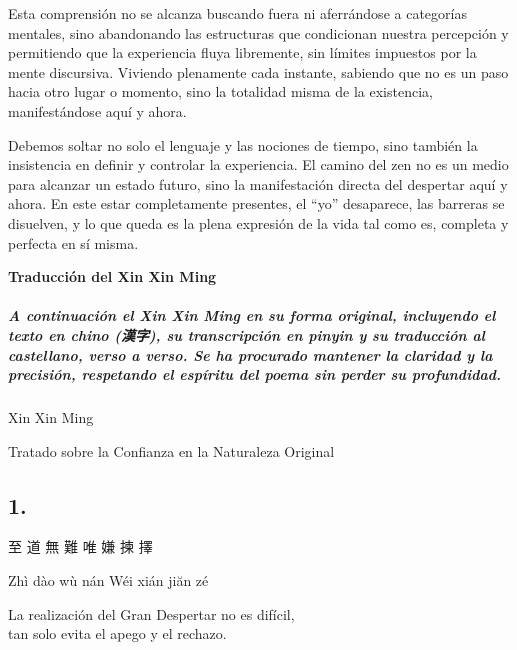 \documentclass[
  a5paperpaper,
]{article}
\begin{document}
Esta comprensión no se alcanza buscando fuera ni aferrándose a
categorías mentales, sino abandonando las estructuras que condicionan
nuestra percepción y permitiendo que la experiencia fluya libremente,
sin límites impuestos por la mente discursiva. Viviendo plenamente cada
instante, sabiendo que no es un paso hacia otro lugar o momento, sino la
totalidad misma de la existencia, manifestándose aquí y ahora.

Debemos soltar no solo el lenguaje y las nociones de tiempo, sino
también la insistencia en definir y controlar la experiencia. El camino
del zen no es un medio para alcanzar un estado futuro, sino la
manifestación directa del despertar aquí y ahora. En este estar
completamente presentes, el ``yo'' desaparece, las barreras se
disuelven, y lo que queda es la plena expresión de la vida tal como es,
completa y perfecta en sí misma.

\hfill\break

\newpage

\begin{center}\textbf{Traducción del Xin Xin Ming}\end{center}

\hypertarget{a-continuaciuxf3n-el-xin-xin-ming-en-su-forma-original-incluyendo-el-texto-en-chino-ux6f22ux5b57-su-transcripciuxf3n-en-pinyin-y-su-traducciuxf3n-al-castellano-verso-a-verso.-se-ha-procurado-mantener-la-claridad-y-la-precisiuxf3n-respetando-el-espuxedritu-del-poema-sin-perder-su-profundidad.}{%
\subparagraph{A continuación el Xin Xin Ming en su forma original,
incluyendo el texto en chino (漢字), su transcripción en pinyin y su
traducción al castellano, verso a verso. Se ha procurado mantener la
claridad y la precisión, respetando el espíritu del poema sin perder su
profundidad.}\label{a-continuaciuxf3n-el-xin-xin-ming-en-su-forma-original-incluyendo-el-texto-en-chino-ux6f22ux5b57-su-transcripciuxf3n-en-pinyin-y-su-traducciuxf3n-al-castellano-verso-a-verso.-se-ha-procurado-mantener-la-claridad-y-la-precisiuxf3n-respetando-el-espuxedritu-del-poema-sin-perder-su-profundidad.}}

Xin Xin Ming

Tratado sobre la Confianza en la Naturaleza Original

\begin{verseblock}

\hypertarget{section-75}{%
\subsection{1.}\label{section-75}}

至 道 無 難 唯 嫌 揀 擇

Zhì dào wù nán Wéi xián jiăn zé

La realización del Gran Despertar no es difícil,\\
tan solo evita el apego y el rechazo.

\end{verseblock}
\end{document}
